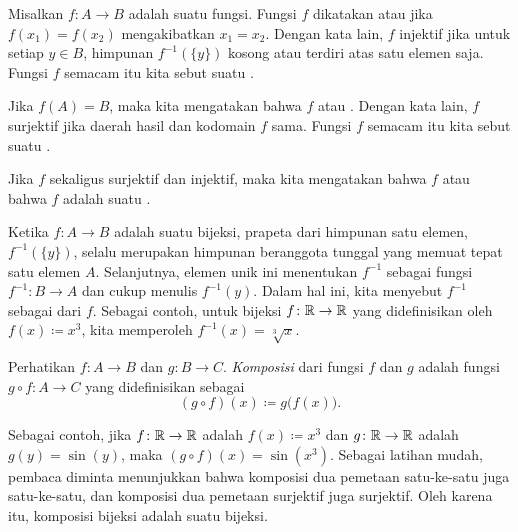 \begin{defn}
Misalkan $f \colon A \to B$ adalah suatu fungsi.
Fungsi $f$ dikatakan
\emph{} atau
\emph{} jika $f(x_1) = f(x_2)$ mengakibatkan $x_1 = x_2$.  Dengan
kata lain,
$f$ injektif jika
untuk setiap $y \in B$, himpunan
$f^{-1}(\{y\})$ kosong atau terdiri atas satu elemen saja.
Fungsi $f$ semacam itu kita sebut suatu \emph{}.

Jika $f(A) = B$, maka kita mengatakan bahwa $f$
\emph{} atau
\emph{}.
Dengan kata lain, $f$ surjektif jika daerah hasil dan kodomain $f$ sama.
Fungsi $f$ semacam itu kita sebut suatu \emph{}.

Jika $f$ sekaligus surjektif dan injektif, maka
kita mengatakan bahwa $f$ \emph{} atau bahwa $f$ adalah suatu
\emph{}.
\end{defn}

Ketika $f \colon A \to B$ adalah suatu bijeksi, prapeta dari himpunan satu
elemen, $f^{-1}(\{y\})$, selalu merupakan himpunan beranggota tunggal yang memuat
tepat satu elemen $A$.  Selanjutnya, elemen unik ini menentukan $f^{-1}$ sebagai fungsi
$f^{-1} \colon B \to A$ dan cukup menulis $f^{-1}(y)$.
Dalam hal ini, kita menyebut $f^{-1}$ sebagai \emph{} dari $f$.
Sebagai contoh, untuk bijeksi $f \colon {\mathbb{R}} \to {\mathbb{R}}$ yang didefinisikan oleh
$f(x) \coloneqq x^3$, kita memperoleh
$f^{-1}(x) = \sqrt[3]{x}$.


\begin{defn}
Perhatikan $f \colon A \to B$ dan $g \colon B \to C$.  \emph{Komposisi}
dari fungsi $f$ dan $g$ adalah fungsi
$g \circ f \colon A \to C$ yang didefinisikan sebagai
\begin{equation*}
(g \circ f)(x) \coloneqq g\bigl(f(x)\bigr) .
\end{equation*}
\end{defn}

Sebagai contoh, jika $f \colon {\mathbb{R}} \to {\mathbb{R}}$ adalah $f(x)\coloneqq x^3$ dan $g \colon {\mathbb{R}} \to {\mathbb{R}}$
adalah $g(y) = \sin(y)$, maka $(g \circ f)(x) = \sin(x^3)$.
Sebagai latihan mudah, pembaca diminta menunjukkan
bahwa komposisi dua pemetaan satu-ke-satu juga satu-ke-satu,
dan komposisi dua pemetaan surjektif juga surjektif.
Oleh karena itu, komposisi bijeksi adalah suatu bijeksi.

